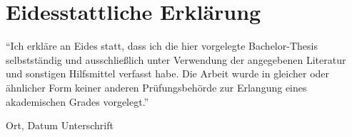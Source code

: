 \cleardoubleoddpage	
\chapter*{Eidesstattliche Erklärung}
\thispagestyle{empty} %

\enquote{Ich erkläre an Eides statt, dass ich die hier vorgelegte Bachelor-Thesis selbstständig und
ausschließlich unter Verwendung der angegebenen Literatur und sonstigen Hilfsmittel verfasst habe.
Die Arbeit wurde in gleicher oder ähnlicher Form keiner anderen Prüfungsbehörde zur Erlangung
eines akademischen Grades vorgelegt.}

\vspace{4cm}

\hspace{2cm} Ort, Datum \hfill Unterschrift \hspace{2cm}